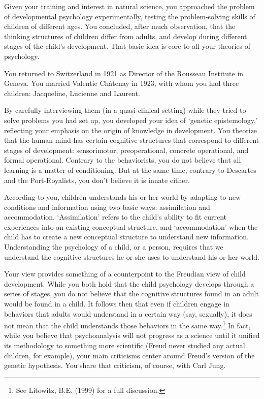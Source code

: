 \begin{refsection}
Given your training and interest in natural science, you approached the problem of developmental psychology experimentally, testing the problem-solving skills of children of different ages. You concluded, after much observation, that the thinking structures of children differ from adults, and develop during different stages of the child's development. That basic idea is core to all your theories of psychology.

You returned to Switzerland in 1921 as Director of the Rousseau Institute in Geneva. You married Valentie Châtenay in 1923, with whom you had three children: Jacqueline, Lucienne and Laurent. 

By carefully interviewing them (in a quasi-clinical setting) while they tried to solve problems you had set up, you developed your idea of `genetic epistemology,' reflecting your emphasis on the origin of knowledge in development. You theorize that the human mind has certain cognitive structures that correspond to different stages of development: sensorimotor, preoperational, concrete operational, and formal operational. Contrary to the behaviorists, you do not believe that all learning is a matter of conditioning. But at the same time, contrary to Descartes and the Port-Royalists, you don't believe it is innate either. 

According to you, children understands his or her world by adapting to new conditions and information using two basic ways: assimilation and accommodation. `Assimilation' refers to the child's ability to fit current experiences into an existing conceptual structure, and `accommodation' when the child has to create a new conceptual structure to understand new information. Understanding the psychology of a child, or a person, requires that we understand the cognitive structures he or she uses to understand his or her world.

Your view provides something of a counterpoint to the Freudian view of child development. While you both hold that the child psychology develops through a series of stages, you do not believe that the cognitive structures found in an adult would be found in a child. It follows then that even if children engage in behaviors that adults would understand in a certain way (say, sexually), it does not mean that the child understands those behaviors in the same way.\footnote{See Litowitz, B.E. (1999) for a full discussion.} In fact, while you believe that psychoanalysis will not progress as a science until it unified its methodology to something more scientific (Freud never studied any actual children, for example), your main criticisms center around Freud's version of the genetic hypothesis. You share that criticism, of course, with Carl Jung.


\end{refsection}
